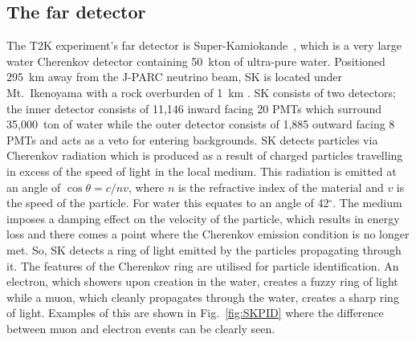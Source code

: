 \subsection{The far detector}
The T2K experiment's far detector is Super-Kamiokande~\cite{Fukuda2003418}, which is a very large water Cherenkov detector containing 50~kton of ultra-pure water.  Positioned 295~km away from the J-PARC neutrino beam, SK is located under Mt.~Ikenoyama with a rock overburden of 1~km .  SK consists of two detectors; the inner detector consists of 11,146 inward facing 20 PMTs which surround 35,000~ton of water while the outer detector consists of 1,885 outward facing 8 PMTs and acts as a veto for entering backgrounds.
\newline
\newline
SK detects particles via Cherenkov radiation which is produced as a result of charged particles travelling in excess of the speed of light in the local medium.  This radiation is emitted at an angle of $\cos \theta = c/nv$, where $n$ is the refractive index of the material and $v$ is the speed of the particle.  For water this equates to an angle of 42$^\circ$.  The medium imposes a damping effect on the velocity of the particle, which results in energy loss and there comes a point where the Cherenkov emission condition is no longer met.  So, SK detects a ring of light emitted by the particles propagating through it.
\newline
\newline
The features of the Cherenkov ring are utilised for particle identification.  An electron, which showers upon creation in the water, creates a fuzzy ring of light while a muon, which cleanly propagates through the water, creates a sharp ring of light.  Examples of this are shown in Fig.~\ref{fig:SKPID} where the difference between muon and electron events can be clearly seen.

